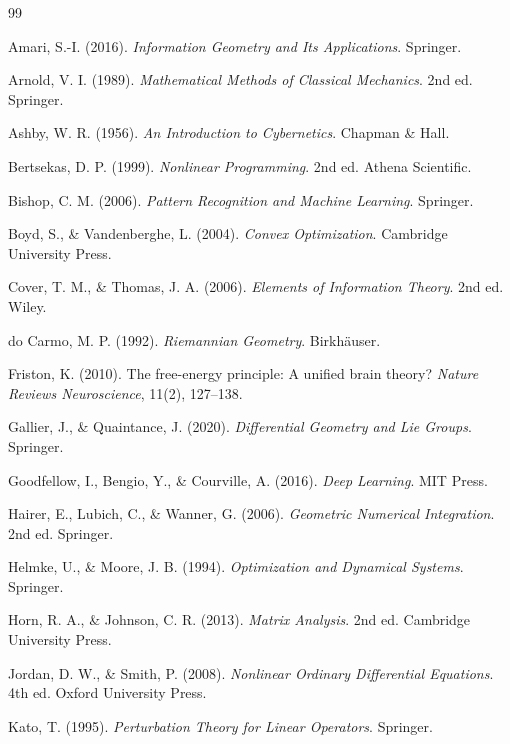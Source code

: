 \documentclass[12pt,oneside]{article}
\theoremstyle{plain}
\theoremstyle{definition}
\theoremstyle{remark}
\begin{document}
\begin{thebibliography}{99}

Amari, S.-I. (2016).
\textit{Information Geometry and Its Applications}.
Springer.

Arnold, V. I. (1989).
\textit{Mathematical Methods of Classical Mechanics}.
2nd ed.
Springer.

Ashby, W. R. (1956).
\textit{An Introduction to Cybernetics}.
Chapman \& Hall.

Bertsekas, D. P. (1999).
\textit{Nonlinear Programming}.
2nd ed.
Athena Scientific.

Bishop, C. M. (2006).
\textit{Pattern Recognition and Machine Learning}.
Springer.

Boyd, S., \& Vandenberghe, L. (2004).
\textit{Convex Optimization}.
Cambridge University Press.

Cover, T. M., \& Thomas, J. A. (2006).
\textit{Elements of Information Theory}.
2nd ed.
Wiley.

do Carmo, M. P. (1992).
\textit{Riemannian Geometry}.
Birkhäuser.

Friston, K. (2010).
The free-energy principle: A unified brain theory?
\textit{Nature Reviews Neuroscience},
11(2), 127--138.

Gallier, J., \& Quaintance, J. (2020).
\textit{Differential Geometry and Lie Groups}.
Springer.

Goodfellow, I.,
Bengio, Y.,
\& Courville, A. (2016).
\textit{Deep Learning}.
MIT Press.

Hairer, E.,
Lubich, C.,
\& Wanner, G. (2006).
\textit{Geometric Numerical Integration}.
2nd ed.
Springer.

Helmke, U.,
\& Moore, J. B. (1994).
\textit{Optimization and Dynamical Systems}.
Springer.

Horn, R. A.,
\& Johnson, C. R. (2013).
\textit{Matrix Analysis}.
2nd ed.
Cambridge University Press.

Jordan, D. W.,
\& Smith, P. (2008).
\textit{Nonlinear Ordinary Differential Equations}.
4th ed.
Oxford University Press.

Kato, T. (1995).
\textit{Perturbation Theory for Linear Operators}.
Springer.


\end{thebibliography}
\end{document}
